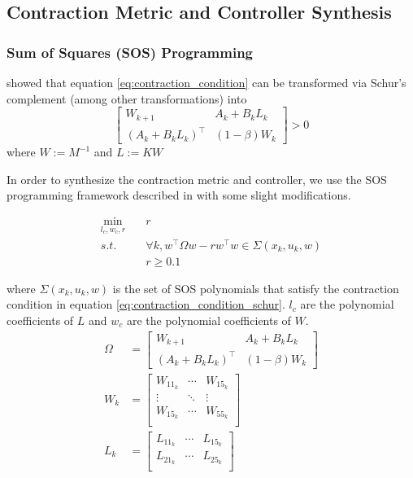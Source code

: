 \documentclass[journal]{IEEEtran}
\begin{document}
\subsection{Contraction Metric and Controller Synthesis}
\subsubsection{Sum of Squares (SOS) Programming}

\autocite{weiControlContractionMetric2021} showed that equation \ref{eq:contraction_condition} can be transformed via Schur's complement (among other transformations) into
\begin{equation}
	\label{eq:contraction_condition_schur}
	\begin{bmatrix}
		W_{k+1} & A_k + B_k L_k \\
		(A_k + B_k L_k)^\top & (1 - \beta) W_k
	\end{bmatrix} > 0
\end{equation}
where $W := M^{-1}$ and $L := KW$

In order to synthesize the contraction metric and controller, we use the SOS programming framework described in \autocite{weiControlContractionMetric2021} with some slight modifications.

\begin{equation}
	\label{eq:dccm_opt}
	\begin{aligned}
	\min_{l_c, w_c, r} \quad& r \\
	s.t. \quad& \forall k, w^\top \Omega w - r w^\top w \in \Sigma(x_k, u_k, w) \\
	& r \geq 0.1
	\end{aligned}
\end{equation}

where $\Sigma(x_k, u_k, w)$ is the set of SOS polynomials that satisfy the contraction condition in equation \ref{eq:contraction_condition_schur}. $l_c$ are the polynomial coefficients of $L$ and $w_c$ are the polynomial coefficients of $W$.
\begin{equation}
	\label{eq:dccm_opt_params}
	\begin{aligned}
	\Omega &=
	\begin{bmatrix}
		W_{k+1} & A_k + B_k L_k \\
		(A_k + B_k L_k)^\top & (1 - \beta) W_k
	\end{bmatrix} \\
	W_k &= 
	\begin{bmatrix}
		W_{11_k} & \cdots & W_{15_k} \\
		\vdots & \ddots & \vdots \\
		W_{15_k} & \cdots & W_{55_k} \\
	\end{bmatrix} \\
	L_k &=
	\begin{bmatrix}
		L_{11_k} & \cdots & L_{15_k} \\
		L_{21_k} & \cdots & L_{25_k} \\
	\end{bmatrix} \\
	\end{aligned}
\end{equation}
\end{document}
